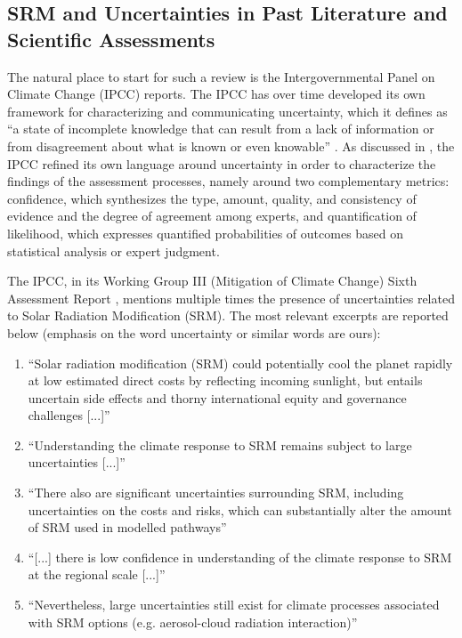 \documentclass[draft]{agujournal2019}
\providecommand{\DIFaddbegin}{} %
\providecommand{\DIFaddend}{} %
\begin{document}
\subsection{SRM and Uncertainties in Past Literature and Scientific Assessments}

The natural place to start for such a review is the Intergovernmental Panel on Climate Change (IPCC) reports. The IPCC has over time developed its own framework for characterizing and communicating uncertainty, which it defines as ``a state of incomplete knowledge that can result from a lack of information or from disagreement about what is known or even knowable'' \cite{IPCC_2013_WGI_SPM}. As discussed in , the IPCC refined its own language around uncertainty in order to characterize the findings of the assessment processes, namely around two complementary metrics: confidence, which synthesizes the type, amount, quality, and consistency of evidence and the degree of agreement among experts, and quantification of likelihood, which expresses quantified probabilities of outcomes based on statistical analysis or expert judgment.

The IPCC, in its Working Group III (Mitigation of Climate Change) Sixth Assessment Report \cite{IPCC_2022_WGIII}, mentions multiple times the presence of uncertainties related to Solar Radiation Modification (SRM). The most relevant excerpts are reported below (emphasis on the word uncertainty or similar words are ours):

\begin{enumerate}
    \item ``Solar radiation modification (SRM) could potentially cool the planet rapidly at low estimated direct costs by reflecting incoming sunlight, but entails uncertain side effects and thorny international equity and governance challenges [...]''
    \item ``Understanding the climate response to SRM remains subject to large uncertainties [...]''
    \item ``There also are significant uncertainties surrounding SRM, including uncertainties on the costs and risks, which can substantially alter the amount of SRM used in modelled pathways''
    \item ``[...] there is low confidence in understanding of the climate response to SRM at the regional scale [...]''
    \DIFaddbegin \item \DIFaddend ``Nevertheless, large uncertainties still exist for climate processes associated with SRM options (e.g. aerosol-cloud radiation interaction)''
\end{enumerate}
\end{document}
